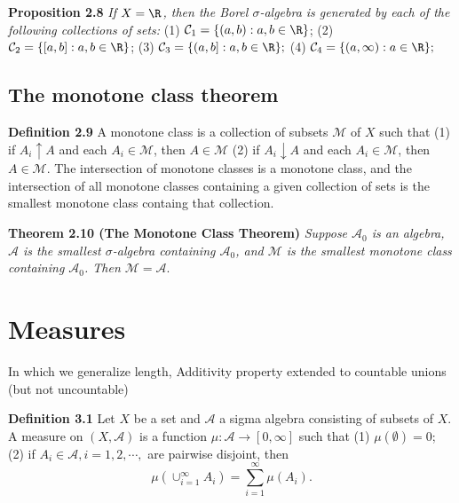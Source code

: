 \begin{sloppypar}
\noindent \textbf{Proposition 2.8} \textit{If $X = \R$, then the Borel $\sigma$-algebra is generated by each of the following collections of sets:}
  \newline (1) $\mathcal{C}_1 = \lbrace (a,b): a,b \in \R \rbrace $;
  \newline (2) $ \mathcal{C}_2 =  \lbrace [a,b]:a,b \in \R \rbrace$;
  \newline (3) $\mathcal{C}_3 = \lbrace (a,b] : a, b \in \R \rbrace ;$
  \newline (4) $\mathcal{C}_4 = \lbrace (a,\infty) : a \in \R \rbrace ;$
  \section{The monotone class theorem}
  \noindent \textbf{Definition 2.9} A monotone class is a collection of subsets $\mathcal{M}$ of $X$ such that
\newline (1) if $A_i \uparrow A$ and each $A_i \in \mathcal{M}$, then $A \in \mathcal{M}$
\newline (2) if $A_i \downarrow A$ and each $A_i \in \mathcal{M}$, then $A \in \mathcal{M}$.
\newline The intersection of monotone classes is a monotone class, and the intersection of all monotone classes containing a given collection of sets is the smallest monotone class containg that collection.

\noindent \textbf{Theorem 2.10 (The Monotone Class Theorem)} \textit{Suppose $\mathcal{A}_0$ is an algebra, $\mathcal{A}$ is the smallest $\sigma$-algebra containing $\mathcal{A}_0$, and $\mathcal{M}$ is the smallest monotone class containing $\mathcal{A}_0$. Then $\mathcal{M} = \mathcal{A}.$}

\chapter{Measures}
\indent In which we generalize length, Additivity property extended to countable unions (but not uncountable)

\noindent \textbf{Definition 3.1} Let $X$ be a set and $\mathcal{A}$ a sigma algebra consisting of subsets of $X$. A measure on $(X,\mathcal{A})$ is a function $\mu : \mathcal{A} \rightarrow [0,\infty]$ such that
\newline (1) $\mu(\emptyset) = 0$;
\newline (2) if $A_i \in \mathcal{A}, i =1,2,\cdots,$ are pairwise disjoint, then
$$\mu(\cup_{i=1}^{\infty}A_i)=\sum_{i=1}^{\infty}\mu(A_i).$$


\end{sloppypar}
